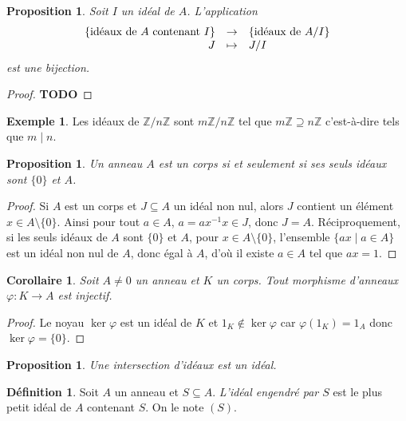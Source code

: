 \documentclass{article}
\newcommand{\Z}{\mathbb{Z}}
\newcommand{\todo}{\textbf{TODO}}
\newcommand{\applic}[4]{\begin{array}[t]{rcl}
#1 & \to & #2 \\
#3 & \mapsto & #4
\end{array}}
\theoremstyle{plain}
\newtheorem{proposition}[theorem]{Proposition}
\newtheorem{corollary}[theorem]{Corollaire}
\theoremstyle{definition}
\newtheorem{definition}[theorem]{Définition}
\newtheorem{example}[theorem]{Exemple}
\theoremstyle{remark}
\begin{document}
\begin{proposition}
    Soit $I$ un idéal de $A$. L'application
    \[\applic{\{\text{idéaux de $A$ contenant $I$}\}}{\{\text{idéaux de $A/I$}\}}{J}{J/I}\]
    est une bijection.
\end{proposition}

\begin{proof}
    \todo
\end{proof}

\begin{example}
    Les idéaux de $\Z/n\Z$ sont $m\Z/n\Z$ tel que $m\Z \supseteq n\Z$ c'est-à-dire tels que $m \mid n$.
\end{example}

\begin{proposition}
    Un anneau $A$ est un corps si et seulement si ses seuls idéaux sont $\{0\}$ et $A$.
\end{proposition}

\begin{proof}
    Si $A$ est un corps et $J \subseteq A$ un idéal non nul, alors $J$ contient un élément $x \in A \setminus\{0\}$. Ainsi pour tout $a \in A$, $a = ax^{-1}x \in J$, donc $J=A$. Réciproquement, si les seuls idéaux de $A$ sont $\{0\}$ et $A$, pour $x\in A\setminus\{0\}$, l'ensemble $\{ax \mid a \in A\}$ est un idéal non nul de $A$, donc égal à $A$, d'où il existe $a \in A$ tel que $ax = 1$.
\end{proof}

\begin{corollary}
    Soit $A \ne 0$ un anneau et $K$ un corps. Tout morphisme d'anneaux $\varphi : K \to A$ est injectif.
\end{corollary}

\begin{proof}
    Le noyau $\ker \varphi$ est un idéal de $K$ et $1_K \notin \ker \varphi$ car $\varphi(1_K) = 1_A$ donc $\ker \varphi = \{0\}$.
\end{proof}

\begin{proposition}
    Une intersection d'idéaux est un idéal.
\end{proposition}

\begin{definition}
    Soit $A$ un anneau et $S \subseteq A$. \emph{L'idéal engendré par $S$} est le plus petit idéal de $A$ contenant $S$. On le note $(S)$.
\end{definition}
\end{document}
